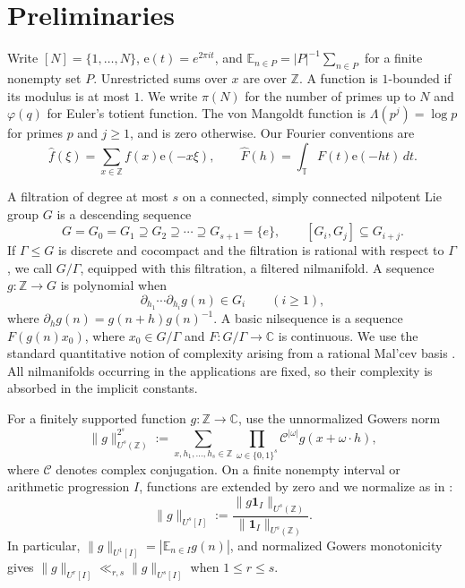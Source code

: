 \documentclass[12pt]{amsart}
\newcommand{\E}{\mathbb E}
\newcommand{\Z}{\mathbb Z}
\newcommand{\C}{\mathbb C}
\newcommand{\1}{\mathbf 1}
\newcommand{\e}{\mathrm e}
\theoremstyle{definition}
\begin{document}
\section{Preliminaries}\label{s:preliminaries}


Write \([N]=\{1,\ldots,N\}\), \(\e(t)=e^{2\pi i t}\), and
\(\E_{n\in P}=|P|^{-1}\sum_{n\in P}\) for a finite nonempty set \(P\).
Unrestricted sums over \(x\) are over \(\Z\).  A function is
\(1\)-bounded if its modulus is at most \(1\).
We write $\pi(N)$ for the number of primes up to $N$ and
$\varphi(q)$ for Euler's totient function. The von Mangoldt
function is $\Lambda(p^j)=\log p$ for primes $p$ and $j\geq1$,
and is zero otherwise. Our Fourier conventions are
\[
 \widehat f(\xi)=\sum_{x\in\mathbb Z}f(x)\e(-x\xi),
 \qquad
 \widehat F(h)=\int_{\mathbb T}F(t)\e(-ht)\,dt.
\]

A filtration of degree at most \(s\) on a connected, simply connected
nilpotent Lie group \(G\) is a descending sequence
\[
 G=G_0=G_1\supseteq G_2\supseteq\cdots\supseteq G_{s+1}=\{e\},
 \qquad [G_i,G_j]\subseteq G_{i+j}.
\]
If \(\Gamma\le G\) is discrete and cocompact and the filtration is
rational with respect to \(\Gamma\), we call \(G/\Gamma\), equipped with
this filtration, a filtered nilmanifold.  A sequence \(g:\Z\to G\) is
polynomial when
\[
 \partial_{h_1}\cdots\partial_{h_i}g(n)\in G_i
 \qquad(i\ge1),
\]
where \(\partial_hg(n)=g(n+h)g(n)^{-1}\).  A basic nilsequence is a
sequence \(F(g(n)x_0)\), where \(x_0\in G/\Gamma\) and
\(F:G/\Gamma\to\C\) is continuous.  We use the standard quantitative
notion of complexity arising from a rational Mal'cev basis
\cite[Section~2]{GreenTaoNil}.  All
nilmanifolds occurring in the applications are fixed, so their complexity
is absorbed in the implicit constants.

For a finitely supported function \(g:\mathbb Z\to\mathbb C\), use the
unnormalized Gowers norm
\[
 \|g\|_{U^s(\mathbb Z)}^{2^s}
 :=\sum_{x,h_1,\ldots,h_s\in\mathbb Z}
   \prod_{\omega\in\{0,1\}^s}
   \mathcal C^{|\omega|}g(x+\omega\cdot h),
\]
where \(\mathcal C\) denotes complex conjugation. On a finite nonempty interval or arithmetic progression
\(I\), functions are extended by zero and we normalize as in
\cite[Section~2.3]{KMTT}:
\begin{equation}\label{e:normalized-gowers}
 \|g\|_{U^s[I]}
 :=\frac{\|g\mathbf1_I\|_{U^s(\mathbb Z)}}
          {\|\mathbf1_I\|_{U^s(\mathbb Z)}}.
\end{equation}
In particular, \(\|g\|_{U^1[I]}=|\mathbb E_{n\in I}g(n)|\), and
normalized Gowers monotonicity gives
\(\|g\|_{U^r[I]}\ll_{r,s}\|g\|_{U^s[I]}\) when \(1\le r\le s\).
\end{document}
